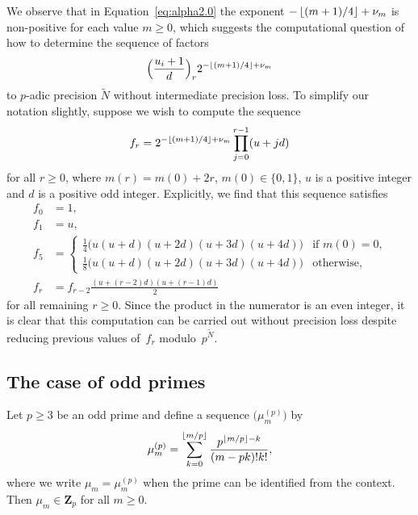 \begin{rem}
We observe that in Equation~\eqref{eq:alpha2.0} the exponent 
$-\left\lfloor(m+1)/4\right\rfloor+\nu_m$ is non-positive for each value $m \geq 0$, 
which suggests the computational question of how to determine the 
sequence of factors 
\begin{equation*}
\Bigl(\frac{u_i+1}{d}\Bigr)_r 2^{- \left\lfloor(m+1)/4\right\rfloor + \nu_m}
\end{equation*}
to $p$-adic precision $\tilde{N}$ without intermediate precision loss.
To simplify our notation slightly, suppose we wish to compute the sequence
\begin{equation*}
f_r = 2^{- \left\lfloor(m+1)/4\right\rfloor + \nu_m} \prod_{j=0}^{r-1} (u + j d)
\end{equation*}
for all $r \geq 0$, where $m(r) = m(0) + 2r$, $m(0) \in \{0,1\}$, 
$u$ is a positive integer and $d$ is a positive odd integer.
Explicitly, we find that this sequence satisfies 
\begin{align*}
f_0 & = 1, \\
f_1 & = u, \\
f_5 & = \begin{cases}
        \displaystyle \tfrac{1}{4} \bigl( u (u + d) (u + 2d) (u + 3d) (u + 4d) \bigr)
            & \text{if $m(0)=0$,} \\
        \displaystyle \tfrac{1}{8} \bigl( u (u + d) (u + 2d) (u + 3d) (u + 4d) \bigr)
            & \text{otherwise,}
        \end{cases} \\
f_r & = f_{r-2} \frac{(u + (r - 2)d)(u + (r - 1)d)}{2}
\end{align*}
for all remaining $r \geq 0$.  Since the product in the numerator is 
an even integer, it is clear that this computation can be carried 
out without precision loss despite reducing previous values of~$f_r$ 
modulo~$p^{\tilde{N}}$.
\end{rem}


\subsection{The case of odd primes}

\begin{lem} \label{lem:mup}
Let $p \geq 3$ be an odd prime and define a sequence 
$\bigl(\mu_m^{(p)}\bigr)$ by 
\begin{equation*}
\mu_m^{(p)} = \sum_{k=0}^{\left\lfloor m/p\right\rfloor} \frac{p^{\left\lfloor m/p\right\rfloor - k}}{(m-pk)! k!}, 
\end{equation*}
where we write $\mu_m = \mu_m^{(p)}$ when the prime can be identified 
from the context.  Then $\mu_m \in \mathbf{Z}_p$ for all $m \geq 0$.
\end{lem}

